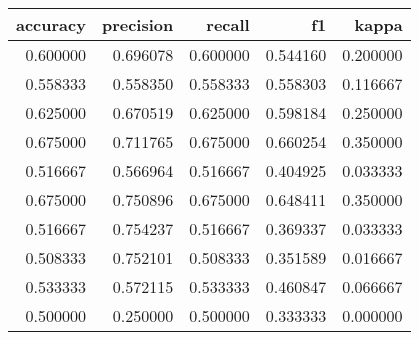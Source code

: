\begin{tabular}{rrrrr}
\toprule
accuracy & precision & recall & f1 & kappa \\
\midrule
0.600000 & 0.696078 & 0.600000 & 0.544160 & 0.200000 \\
0.558333 & 0.558350 & 0.558333 & 0.558303 & 0.116667 \\
0.625000 & 0.670519 & 0.625000 & 0.598184 & 0.250000 \\
0.675000 & 0.711765 & 0.675000 & 0.660254 & 0.350000 \\
0.516667 & 0.566964 & 0.516667 & 0.404925 & 0.033333 \\
0.675000 & 0.750896 & 0.675000 & 0.648411 & 0.350000 \\
0.516667 & 0.754237 & 0.516667 & 0.369337 & 0.033333 \\
0.508333 & 0.752101 & 0.508333 & 0.351589 & 0.016667 \\
0.533333 & 0.572115 & 0.533333 & 0.460847 & 0.066667 \\
0.500000 & 0.250000 & 0.500000 & 0.333333 & 0.000000 \\
\bottomrule
\end{tabular}
